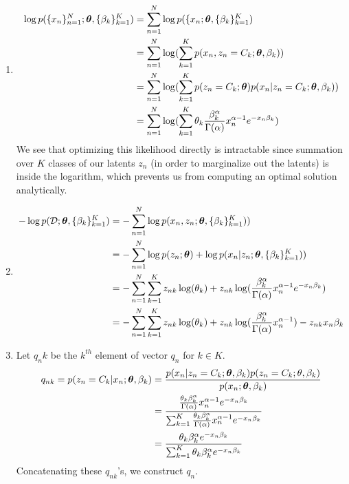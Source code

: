 \documentclass[submit]{harvardml}
\begin{document}
\begin{enumerate}
  \item 
  \begin{align}
      \log p(\{x_n\}^N_{n=1}; \boldsymbol{\theta}, \{\beta_k\}^K_{k = 1}) &= \sum_{n=1}^N \log p(\{x_n; \boldsymbol{\theta}, \{\beta_k\}^K_{k = 1}) \\
      &= \sum_{n=1}^N \log (\sum_{k=1}^K p(x_n, z_n = C_k; \boldsymbol{\theta}, \beta_k)) \\
      &= \sum_{n=1}^N \log (\sum_{k=1}^K p(z_n = C_k; \boldsymbol{\theta}) p(x_n | z_n = C_k; \boldsymbol{\theta}, \beta_k)) \\
      &= \sum_{n=1}^N \log (\sum_{k=1}^K \theta_k \frac{\beta_k^\alpha}{\Gamma(\alpha)} x_n^{\alpha-1} e^{-x_n \beta_k})
  \end{align}
  We see that optimizing this likelihood directly is intractable since summation over $K$ classes of our latents $z_n$ (in order to marginalize out the latents) is inside the logarithm, which prevents us from computing an optimal solution analytically.
  
  
  \item 
  \begin{align}
      -\log p(\mathcal D; \boldsymbol{\theta}, \{\beta_k\}^K_{k=1}) &= - \sum_{n=1}^N \log p(x_n, z_n; \boldsymbol{\theta}, \{\beta_k\}_{k=1}^K)) \\
      &= - \sum_{n=1}^N \log p(z_n; \boldsymbol{\theta}) + \log p(x_n | z_n; \boldsymbol{\theta}, \{\beta_k\}_{k=1}^K)) \\
      &= - \sum_{n=1}^N \sum_{k=1}^K z_{nk} \log (\theta_k) + z_{nk} \log (\frac{\beta_k^\alpha}{\Gamma(\alpha)} x_n^{\alpha-1} e^{-x_n \beta_k}) \\
      &= - \sum_{n=1}^N \sum_{k=1}^K z_{nk} \log (\theta_k) + z_{nk} \log (\frac{\beta_k^\alpha}{\Gamma(\alpha)} x_n^{\alpha-1}) - z_{nk} x_n \beta_k
  \end{align}
  
  
  \item  
  Let $q_nk$ be the $k^{th}$ element of vector $q_n$ for $k \in  K$. 
  \begin{align}
      q_{nk} = p(z_n = C_k | x_n ; \boldsymbol{\theta}, \beta_k) &= \frac{p(x_n | z_n = C_k; \boldsymbol{\theta}, \beta_k) p(z_n = C_k; \theta, \beta_k)}{p(x_n; \boldsymbol{\theta}, \beta_k)} \\
      &= \frac{\frac{\theta_k \beta_k^\alpha}{\Gamma(\alpha)} x_n^{\alpha-1} e^{-x_n \beta_k}}{\sum_{k=1}^K \frac{\theta_k \beta_k^\alpha}{\Gamma(\alpha)} x_n^{\alpha-1} e^{-x_n \beta_k}} \\
      &= \frac{{\theta_k \beta_k^\alpha}  e^{-x_n \beta_k}}{\sum_{k=1}^K {\theta_k \beta_k^\alpha}  e^{-x_n \beta_k}}
  \end{align}
  Concatenating these $q_{nk}$'s, we construct $q_n$.
  

\end{enumerate}
\end{document}
